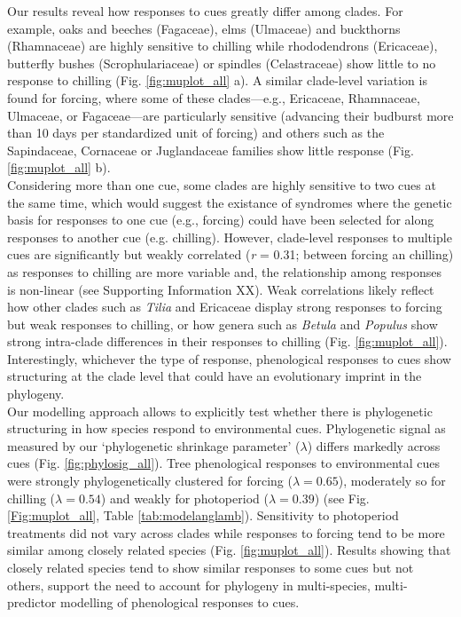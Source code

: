 \documentclass{article}\usepackage[]{graphicx}\usepackage[]{color}
\begin{document}
Our results reveal how responses to cues greatly differ among clades. For example, oaks and beeches (Fagaceae), elms (Ulmaceae) and buckthorns (Rhamnaceae) are highly sensitive to chilling while rhododendrons (Ericaceae), butterfly bushes (Scrophulariaceae) or spindles (Celastraceae) show little to no response to chilling (Fig. \ref{fig:muplot_all} a). %
A similar clade-level variation is found for forcing, where some of these clades---e.g., Ericaceae, Rhamnaceae, Ulmaceae, or Fagaceae---are particularly sensitive (advancing their budburst more than 10 days per standardized unit of forcing) and others such as the Sapindaceae, Cornaceae or Juglandaceae families show little response (Fig. \ref{fig:muplot_all} b).\\ 

Considering more than one cue, some clades are highly sensitive to two cues at the same time, which would suggest the existance of syndromes where the genetic basis for responses to one cue (e.g., forcing) could have been selected for along responses to another cue (e.g. chilling). However, clade-level responses to multiple cues are significantly but weakly correlated (\emph{r} = 0.31; between forcing an chilling) as responses to chilling are more variable and, the relationship among responses is non-linear (see Supporting Information XX). Weak correlations likely reflect how other clades such as \emph{Tilia} and Ericaceae display strong responses to forcing but weak responses to chilling, or how genera such as \emph{Betula} and \emph{Populus} show strong intra-clade differences in their responses to chilling (Fig. \ref{fig:muplot_all}). Interestingly, whichever the type of response, phenological responses to cues show structuring at the clade level that could have an evolutionary imprint in the phylogeny. %
\\

Our modelling approach allows to explicitly test whether there is phylogenetic structuring in how species respond to environmental cues. Phylogenetic signal as measured by our `phylogenetic shrinkage parameter' ($\lambda$) differs markedly across cues (Fig. \ref{fig:phylosig_all}). Tree phenological responses to environmental cues were strongly phylogenetically clustered for forcing ($\lambda = 0.65$), moderately so for chilling ($\lambda = 0.54$) and weakly for photoperiod ($\lambda= 0.39$) (see Fig. \ref{Fig:muplot_all}, Table \ref{tab:modelanglamb}). Sensitivity to photoperiod treatments did not vary across clades while responses to forcing tend to be more similar among closely related species (Fig. \ref{fig:muplot_all}). Results showing that closely related species tend to show similar responses to some cues but not others, support the need to account for phylogeny in multi-species, multi-predictor modelling of phenological responses to cues.\\
\end{document}

